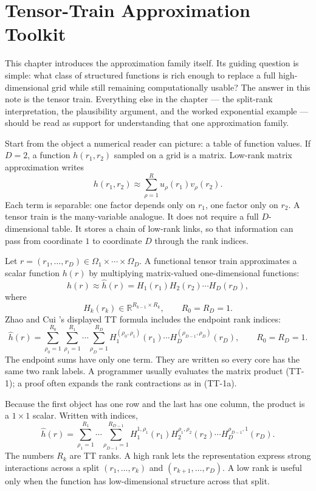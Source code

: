 \documentclass[11pt]{article}
\numberwithin{equation}{section}
\newcommand{\R}{\mathbb R}
\begin{document}
\section{Tensor-Train Approximation Toolkit}

This chapter introduces the approximation family itself.  Its guiding question is
simple: what class of structured functions is rich enough to replace a full
high-dimensional grid while still remaining computationally usable?  The answer in
this note is the tensor train.  Everything else in the chapter --- the split-rank
interpretation, the plausibility argument, and the worked exponential example ---
should be read as support for understanding that one approximation family.

Start from the object a numerical reader can picture: a table of function values.
If \(D=2\), a function \(h(r_1,r_2)\) sampled on a grid is a matrix.  Low-rank
matrix approximation writes
\[
    h(r_1,r_2)\approx \sum_{\rho=1}^{R} u_\rho(r_1)v_\rho(r_2).
\]
Each term is separable: one factor depends only on \(r_1\), one factor only on
\(r_2\).  A tensor train is the many-variable analogue.  It does not require a
full \(D\)-dimensional table.  It stores a chain of low-rank links, so that
information can pass from coordinate \(1\) to coordinate \(D\) through the rank
indices.

Let \(r=(r_1,\ldots,r_D)\in\Omega_1\times\cdots\times\Omega_D\).  A functional
tensor train approximates a scalar function \(h(r)\) by multiplying
matrix-valued one-dimensional functions:
\begin{equation}
    h(r)
    \approx
    \widehat h(r)
    =
    H_1(r_1)H_2(r_2)\cdots H_D(r_D),
    \label{eq:p24-tt-1}
\end{equation}
where
\[
    H_k(r_k)\in \R^{R_{k-1}\times R_k},\qquad R_0=R_D=1.
\]
Zhao and Cui \cite{zhao2024ttsequential}'s displayed TT formula includes the endpoint rank indices:
\begin{equation}
    \widehat h(r)
    =
    \sum_{\rho_0=1}^{R_0}\sum_{\rho_1=1}^{R_1}\cdots
    \sum_{\rho_D=1}^{R_D}
    H_1^{(\rho_0,\rho_1)}(r_1)\cdots
    H_D^{(\rho_{D-1},\rho_D)}(r_D),
    \qquad R_0=R_D=1.
    \label{eq:p24-tt-1a}
\end{equation}
The endpoint sums have only one term.  They are written so every core has the
same two rank labels.  A programmer usually evaluates the matrix product
(TT-1); a proof often expands the rank contractions as in (TT-1a).

Because the first object has one row and the last has one column, the product is
a \(1\times 1\) scalar.  Written with indices,
\begin{equation}
    \widehat h(r)
    =
    \sum_{\rho_1=1}^{R_1}\cdots
    \sum_{\rho_{D-1}=1}^{R_{D-1}}
    H_1^{1,\rho_1}(r_1)
    H_2^{\rho_1,\rho_2}(r_2)\cdots
    H_D^{\rho_{D-1},1}(r_D).
    \label{eq:p24-tt-2}
\end{equation}
The numbers \(R_k\) are TT ranks.  A high rank lets the representation express
strong interactions across a split \((r_1,\ldots,r_k)\) and
\((r_{k+1},\ldots,r_D)\).  A low rank is useful only when the function has
low-dimensional structure across that split.
\end{document}

